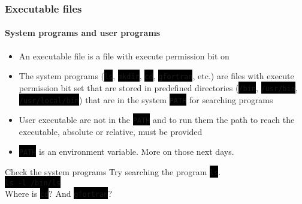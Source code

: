 \documentclass[unknownkeysallowed, 10pt, a4 paper, handout]{beamer}
\newcommand{\code}[1]{\colorbox{black}{\color{green}\texttt{#1}}}
\begin{document}
\begin{frame}[label=executables]
  \frametitle{Executable files}
  \framesubtitle{System programs and user programs}
  \begin{itemize}
    \item An executable file is a file with execute permission bit on
    \item The system programs (\code{ls}, \code{mkdir}, \code{cd},
      \code{gfortran}, etc.) are files with execute permission bit set
      that are stored in predefined directories (\code{/bin}, \code{/usr/bin},
      \code{/usr/local/bin}) that are in the system \code{PATH} for
      searching programs
    \item User executable are not in the \code{PATH} and to run them the
      path to reach the executable, absolute or relative, must be provided
    \item \code{PATH} is an environment variable. More on those next days.
  \end{itemize}
  \begin{alertblock}{Check the system programs}
      Try searching the program \code{ls}. \\
      \code{ls -l /bin/ls} \\
      Where is \code{cd}? And \code{gfortran}?
   \end{alertblock}
\end{frame}
\end{document}

